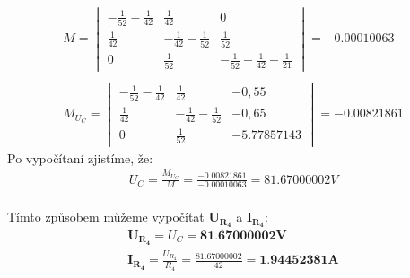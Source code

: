 \begin{gather*}
    M = 
    \begin{vmatrix}
    - \frac{1}{52} - \frac{1}{42} & \frac{1}{42} & 0 \\
        \frac{1}{42} & - \frac{1}{42} - \frac{1}{52} & \frac{1}{52} \\
        0 & \frac{1}{52} & - \frac{1}{52} - \frac{1}{42} - \frac{1}{21}
    \end{vmatrix}
    = -0.00010063 \\\\
    M_{U_C} = 
    \begin{vmatrix}
        - \frac{1}{52} - \frac{1}{42} & \frac{1}{42} & -0,55 \\
        \frac{1}{42} & - \frac{1}{42} - \frac{1}{52} & -0,65 \\
        0 & \frac{1}{52} & -5.77857143
    \end{vmatrix}
    = -0.00821861
\end{gather*}
Po vypočítaní zjistíme, že:
\begin{gather*}
    U_C = \frac{M_{U_C}}{M} = \frac{-0.00821861}{-0.00010063} = 81.67000002 V
\end{gather*}
\\
Tímto způsobem můžeme vypočítat $\boldsymbol{U_{R_4}}$ a $\boldsymbol{I_{R_4}}$:
\begin{gather*}
    \boldsymbol{U_{R_4}} = U_C = \textbf{81.67000002V} \\
    \boldsymbol{I_{R_4}} = \frac{U_{R_4}}{R_4} = \frac{81.67000002}{42} = \textbf{1.94452381A}
\end{gather*}